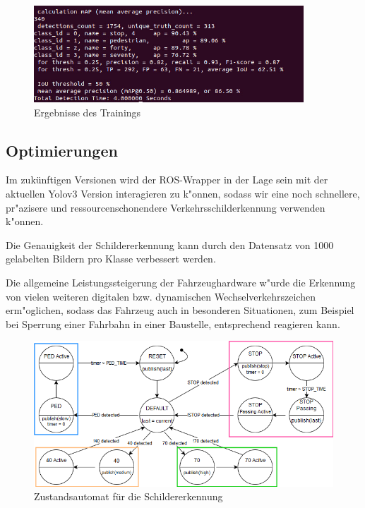 \begin{figure}[ht]
	\centering
	\includegraphics[width=0.9\textwidth]{images/ergebnis}
	\caption{Ergebnisse des Trainings}
	\label{fig:ergebnis}
\end{figure}

\subsection{Optimierungen}
Im zuk\"unftigen Versionen wird der ROS-Wrapper in der Lage sein mit der aktuellen Yolov3 Version interagieren zu k"onnen, sodass wir eine noch schnellere, pr"azisere und ressourcenschonendere Verkehrsschilderkennung verwenden k"onnen.

Die Genauigkeit der Schildererkennung kann durch den Datensatz von 1000 gelabelten Bildern pro Klasse verbessert werden.

Die allgemeine Leistungssteigerung der Fahrzeughardware w"urde die Erkennung von vielen weiteren digitalen bzw. dynamischen Wechselverkehrszeichen erm"oglichen, sodass das Fahrzeug auch in besonderen Situationen, zum Beispiel bei Sperrung einer Fahrbahn in einer Baustelle, entsprechend reagieren kann.

\begin{figure}[ht]
	\centering
	\includegraphics[width = 1\textwidth]{images/StateMachine.png}
	\caption{Zustandsautomat f\"ur die Schildererkennung}
	\label{fig:zustandsautomat}
\end{figure}

